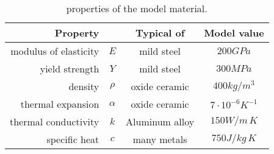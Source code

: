 	\begin{table}[bht]
		\centering
		\caption{properties of the model material.} \label{tab:dist:modelmaterial}
		
		\begin{tabular}{r c | c | c }
			\textbf{Property} && \textbf{Typical of} & \textbf{Model value} \\ \hline
			modulus of elasticity & $E$ & mild steel & $200 GPa$ \\
			yield strength & $Y$ & mild steel & $300 MPa$ \\
			density & $\rho$ & oxide ceramic & $400 kg/m^3$ \\
			thermal expansion & $\alpha$ & oxide ceramic & $7\cdot 10^{-6} K^{-1}$ \\
			thermal conductivity & $k$ & Aluminum alloy & $150 W / m \, K$ \\
			specific heat & $c$ & many metals & $750 J / kg\, K$ \\
		\end{tabular}
		
	\end{table}
	
	
